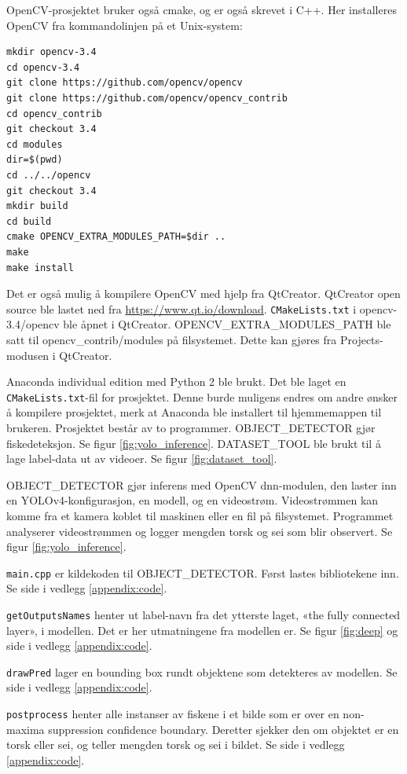 OpenCV-prosjektet bruker også cmake, og er også skrevet i C++. Her installeres OpenCV fra kommandolinjen på et Unix-system:

\begin{verbatim}
mkdir opencv-3.4
cd opencv-3.4
git clone https://github.com/opencv/opencv
git clone https://github.com/opencv/opencv_contrib
cd opencv_contrib
git checkout 3.4
cd modules
dir=$(pwd)
cd ../../opencv
git checkout 3.4
mkdir build
cd build
cmake OPENCV_EXTRA_MODULES_PATH=$dir ..
make
make install
\end{verbatim}

Det er også mulig å kompilere OpenCV med hjelp fra QtCreator. QtCreator open source ble lastet ned fra \url{https://www.qt.io/download}. \texttt{CMakeLists.txt} i opencv-3.4/opencv ble åpnet i QtCreator. OPENCV\_EXTRA\_MODULES\_PATH ble satt til opencv\_contrib/modules på filsystemet. Dette kan gjøres fra Projects-modusen i QtCreator.

Anaconda individual edition med Python 2 ble brukt. Det ble laget en \texttt{CMakeLists.txt}-fil for prosjektet. Denne burde muligens endres om andre ønsker å kompilere prosjektet, merk at Anaconda ble installert til hjemmemappen til brukeren. Prosjektet består av to programmer. OBJECT\_DETECTOR gjør fiskedeteksjon. Se figur \ref{fig:yolo_inference}. DATASET\_TOOL ble brukt til å lage label-data ut av videoer. Se figur \ref{fig:dataset_tool}.

OBJECT\_DETECTOR gjør inferens med OpenCV dnn-modulen, den laster inn en YOLOv4-konfigurasjon, en modell, og en videostrøm. Videostrømmen kan komme fra et kamera koblet til maskinen eller en fil på filsystemet. Programmet analyserer videostrømmen og logger mengden torsk og sei som blir observert. Se figur \ref{fig:yolo_inference}.

\texttt{main.cpp} er kildekoden til OBJECT\_DETECTOR. Først lastes bibliotekene inn. Se side \pageref{lst:header} i vedlegg \ref{appendix:code}.

\texttt{getOutputsNames} henter ut label-navn fra det ytterste laget, «the fully connected layer», i modellen. Det er her utmatningene fra modellen er. Se figur \ref{fig:deep} og side \pageref{lst:getOutputsNames} i vedlegg \ref{appendix:code}.

\texttt{drawPred} lager en bounding box rundt objektene som detekteres av modellen. Se side \pageref{lst:drawPred} i vedlegg \ref{appendix:code}.

\texttt{postprocess} henter alle instanser av fiskene i et bilde som er over en non-maxima suppression confidence boundary. Deretter sjekker den om objektet er en torsk eller sei, og teller mengden torsk og sei i bildet. Se side \pageref{lst:postprocess} i vedlegg \ref{appendix:code}.

